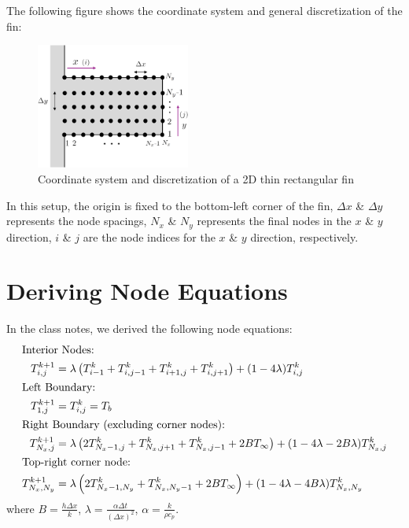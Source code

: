 \documentclass{article}
\newcommand{\ddfrac}[2]{\frac{\displaystyle #1}{\displaystyle #2}}
\begin{document}
The following figure shows the coordinate system and general discretization of the fin:

\begin{figure}[h]
    \centering
    \includegraphics[width=0.45\textwidth]{fig/finSetup.png}
    \caption{Coordinate system and discretization of a 2D thin rectangular fin}
    \label{fig:finSetup}
\end{figure}

In this setup, the origin is fixed to the bottom-left corner of the fin, $\Delta x$ \& $\Delta y$ represents the node spacings, $N_x$ \& $N_y$ represents the final nodes in the $x$ \& $y$ direction, $i$ \& $j$ are the node indices for the $x$ \& $y$ direction, respectively.

\pagebreak

\section{Deriving Node Equations}

In the class notes, we derived the following node equations:
\begin{align}
    \shortintertext{Interior Nodes:}
    T_{i,j}^{k+1}     & = \lambda\left(T_{i-1}^k + T_{i,j-1}^k + T_{i+1,j}^k + T_{i,j+1}^k\right) + (1-4\lambda)T_{i,j}^k                         \\
    \shortintertext{Left Boundary:}
    T_{1,j}^{k+1}     & = T_{i,j}^k = T_b \\
    \shortintertext{Right Boundary (excluding corner nodes):}
    T_{N_x,j}^{k+1}   & = \lambda\left(2T_{N_x-1,j}^k + T_{N_x,j+1}^k + T_{N_x,j-1}^k + 2BT_{\infty}\right) + (1-4\lambda - 2B\lambda)T_{N_x,j}^k \\
    \shortintertext{Top-right corner node:}
    T_{N_x,N_y}^{k+1} & = \lambda\left(2T_{N_x-1,N_y}^k + T_{N_x,N_y-1}^k + 2BT_{\infty}\right) + (1-4\lambda - 4B\lambda)T_{N_x,N_y}^k
\end{align}
where $B = \ddfrac{h \Delta x}{k}$, $\lambda = \ddfrac{\alpha \Delta t}{(\Delta x)^2}$, $\alpha = \ddfrac{k}{\rho c_p}$.\\
\end{document}
